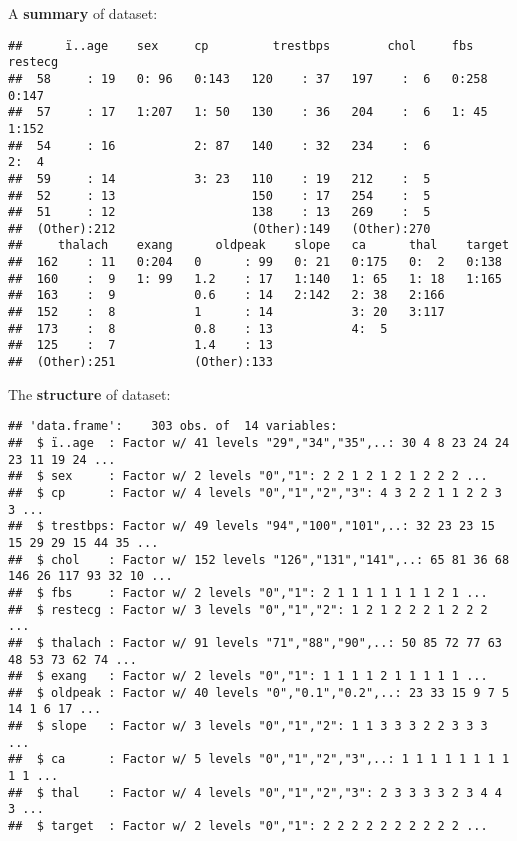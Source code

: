 \documentclass[]{article}
\begin{document}
A \textbf{\textcolor{my.red}{summary}} of dataset:

\begin{verbatim}
##      ï..age    sex     cp         trestbps        chol     fbs     restecg
##  58     : 19   0: 96   0:143   120    : 37   197    :  6   0:258   0:147  
##  57     : 17   1:207   1: 50   130    : 36   204    :  6   1: 45   1:152  
##  54     : 16           2: 87   140    : 32   234    :  6           2:  4  
##  59     : 14           3: 23   110    : 19   212    :  5                  
##  52     : 13                   150    : 17   254    :  5                  
##  51     : 12                   138    : 13   269    :  5                  
##  (Other):212                   (Other):149   (Other):270                  
##     thalach    exang      oldpeak    slope   ca      thal    target 
##  162    : 11   0:204   0      : 99   0: 21   0:175   0:  2   0:138  
##  160    :  9   1: 99   1.2    : 17   1:140   1: 65   1: 18   1:165  
##  163    :  9           0.6    : 14   2:142   2: 38   2:166          
##  152    :  8           1      : 14           3: 20   3:117          
##  173    :  8           0.8    : 13           4:  5                  
##  125    :  7           1.4    : 13                                  
##  (Other):251           (Other):133
\end{verbatim}

The \textbf{\textcolor{my.red}{structure}} of dataset:

\begin{verbatim}
## 'data.frame':    303 obs. of  14 variables:
##  $ ï..age  : Factor w/ 41 levels "29","34","35",..: 30 4 8 23 24 24 23 11 19 24 ...
##  $ sex     : Factor w/ 2 levels "0","1": 2 2 1 2 1 2 1 2 2 2 ...
##  $ cp      : Factor w/ 4 levels "0","1","2","3": 4 3 2 2 1 1 2 2 3 3 ...
##  $ trestbps: Factor w/ 49 levels "94","100","101",..: 32 23 23 15 15 29 29 15 44 35 ...
##  $ chol    : Factor w/ 152 levels "126","131","141",..: 65 81 36 68 146 26 117 93 32 10 ...
##  $ fbs     : Factor w/ 2 levels "0","1": 2 1 1 1 1 1 1 1 2 1 ...
##  $ restecg : Factor w/ 3 levels "0","1","2": 1 2 1 2 2 2 1 2 2 2 ...
##  $ thalach : Factor w/ 91 levels "71","88","90",..: 50 85 72 77 63 48 53 73 62 74 ...
##  $ exang   : Factor w/ 2 levels "0","1": 1 1 1 1 2 1 1 1 1 1 ...
##  $ oldpeak : Factor w/ 40 levels "0","0.1","0.2",..: 23 33 15 9 7 5 14 1 6 17 ...
##  $ slope   : Factor w/ 3 levels "0","1","2": 1 1 3 3 3 2 2 3 3 3 ...
##  $ ca      : Factor w/ 5 levels "0","1","2","3",..: 1 1 1 1 1 1 1 1 1 1 ...
##  $ thal    : Factor w/ 4 levels "0","1","2","3": 2 3 3 3 3 2 3 4 4 3 ...
##  $ target  : Factor w/ 2 levels "0","1": 2 2 2 2 2 2 2 2 2 2 ...
\end{verbatim}
\end{document}
